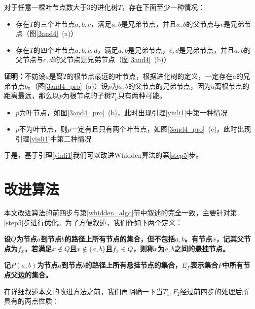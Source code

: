 \begin{yinli}\label{yinli1}
对于任意一棵叶节点数大于$3$的进化树$T$，存在下面至少一种情况：
\begin{itemize}
	\item 存在$T$的三个叶节点$a,b,c$，满足$a,b$是兄弟节点，并且$a,b$的父节点与$c$是兄弟节点（图\ref{3and4}~(a)）
	\item 存在$T$的四个叶节点$a,b,c,d$，满足$a,b$是兄弟节点，$c,d$是兄弟节点，并且$a,b$的父节点与$c,d$的父节点是兄弟节点（图\ref{3and4}~(b)）
\end{itemize}
\end{yinli}

\textbf{证明：}不妨设$a$是离$T$的根节点最远的叶节点，根据进化树的定义，一定存在$a$的兄弟节点$b$。（图\ref{3and4_pro}~(a)）设$p$为$a,b$的父节点的兄弟节点，因为$a$离根节点的距离最远，那么以$p$为根节点的子树$T_p$只有两种可能。
\begin{itemize}
	\item $p$为叶节点，如图\ref{3and4_pro}~(b)，此时出现引理\ref{yinli1}中第一种情况
	\item $p$不为叶节点，则$p$一定有且只有两个叶节点，如图\ref{3and4_pro}~(c)，此时出现引理\ref{yinli1}中第二种情况
\end{itemize}


于是，基于引理\ref{yinli1}我们可以改进Whidden算法的第\ref{step5}步。

\section{改进算法}
本文改进算法的前四步与第\ref{whidden_algo}节中叙述的完全一致，主要针对第\ref{step5}步进行优化。为了方便叙述，我们作如下两个定义：

\begin{dingyi}
\textbf{设$Q$为节点$a$到节点$b$的路径上所有节点的集合，但不包括$a,b$。有节点$x$，记其父节点为$f_x$，若满足$x \notin Q$且$x \notin \{a,b\}$且$f_x \in Q$，则称$x$为$a,b$之间的悬挂节点。}
\end{dingyi}

\begin{dingyi}
\textbf{记$P(a,b)$为节点$a$到节点$b$的路径上所有悬挂节点的集合，$E_P$表示集合$P$中所有节点父边的集合。}
\end{dingyi}


在详细叙述本文的改进方法之前，我们再明确一下当$T_1,F_2$经过前四步的处理后所具有的两点性质：

